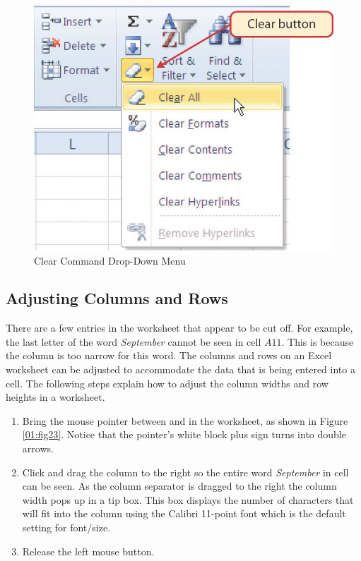 \begin{figure}[H]
	\centering
	\includegraphics[width=\maxwidth{.95\linewidth}]{gfx/ch01_fig22}
	\caption{Clear Command Drop-Down Menu}
	\label{01:fig22}
\end{figure}

\subsection{Adjusting Columns and Rows}

There are a few entries in the worksheet that appear to be cut off. For example, the last letter of the word \textit{September} cannot be seen in cell $ A11 $. This is because the column is too narrow for this word. The columns and rows on an Excel worksheet can be adjusted to accommodate the data that is being entered into a cell. The following steps explain how to adjust the column widths and row heights in a worksheet.

\begin{enumbox}
	\begin{enumerate}
		\item Bring the mouse pointer between  and  in the  worksheet, as shown in Figure \ref{01:fig23}. Notice that the pointer's white block plus sign turns into double arrows.
		\item Click and drag the column to the right so the entire word \textit{September} in cell  can be seen. As the column separator is dragged to the right the column width pops up in a tip box. This box displays the number of characters that will fit into the column using the Calibri 11-point font which is the default setting for font/size.
		\item Release the left mouse button.
	\end{enumerate}
\end{enumbox}
	
